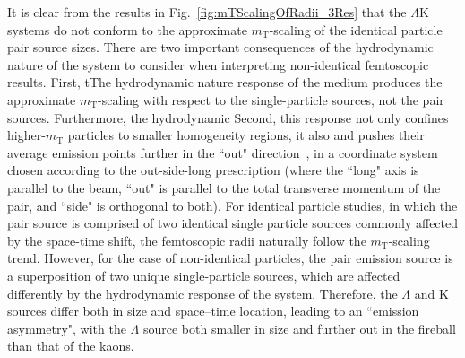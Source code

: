 \documentclass[ALICE,manyauthors]{cernphprep}
\newcommand{\mt}{$m_{\mathrm{T}}$\xspace}
\newcommand{\Lam}{$\Lambda$\xspace}
\newcommand{\LamK}{$\Lambda$K\xspace}
\begin{document}
It is clear from the results in Fig.~\ref{fig:mTScalingOfRadii_3Res} that the \LamK systems do not conform to the approximate \mt-scaling of the identical particle pair source sizes.
{\color{blue}There are two important consequences of the hydrodynamic nature of the system to consider when interpreting non-identical femtoscopic results.}
{\color{blue}First, t}{\color{red}T}he hydrodynamic {\color{red}nature} {\color{blue}response} of the medium produces the approximate \mt-scaling with respect to the single-particle sources{\color{red}, not the pair sources}.
{\color{red}Furthermore, the hydrodynamic} {\color{blue}Second, this} response {\color{red}not only} confines higher-\mt particles to smaller homogeneity regions{\color{red}, it also} {\color{blue}and} pushes their average emission points further in the ``out" direction~\cite{Retiere:2003kf}{\color{red},} in a coordinate system chosen according to the out-side-long prescription (where the ``long" axis is parallel to the beam, ``out" is parallel to the total transverse momentum of the pair, and ``side" is orthogonal to both).
For identical particle studies, in which the pair source is comprised of two identical single particle sources commonly affected by the space-time shift, the femtoscopic radii naturally follow the \mt-scaling trend.
However, for the case of non-identical particles, the pair emission source is a superposition of two unique single-particle sources, which are affected differently by the hydrodynamic response of the system.
Therefore, the \Lam and K sources differ both in size and space--time location, leading to an ``emission asymmetry", with the \Lam source both smaller in size and further out in the fireball than that of the kaons.
\end{document}
